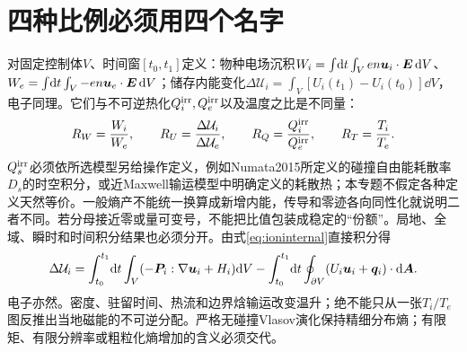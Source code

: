 \documentclass[UTF8,a4paper,11pt,openany,fontset=fandol]{ctexbook}
\begin{document}
\section{四种比例必须用四个名字}
对固定控制体$V$、时间窗$[t_0,t_1]$定义：物种电场沉积$W_i=\int\!\mathrm d t\int_Ven\bm{u}_i\cdot\bm{E}\,\mathrm d V$、$W_e=\int\!\mathrm d t\int_V-en\bm{u}_e\cdot\bm{E}\,\mathrm d V$；储存内能变化$\Delta\mathcal U_i=\int_V[U_i(t_1)-U_i(t_0)]\dd V$，电子同理。它们与不可逆热化$Q_i^{\rm irr},Q_e^{\rm irr}$以及温度之比是不同量：
\begin{equation}
R_W=\frac{W_i}{W_e},\qquad R_U=\frac{\Delta\mathcal U_i}{\Delta\mathcal U_e},\qquad
R_Q=\frac{Q_i^{\rm irr}}{Q_e^{\rm irr}},\qquad R_T=\frac{T_i}{T_e}.
\end{equation}
$Q_s^{\rm irr}$必须依所选模型另给操作定义，例如Numata2015所定义的碰撞自由能耗散率$D_s$的时空积分，或近Maxwell输运模型中明确定义的耗散热；本专题不假定各种定义天然等价。一般熵产不能统一换算成新增内能，传导和零迹各向同性化就说明二者不同。若分母接近零或量可变号，不能把比值包装成稳定的“份额”。局地、全域、瞬时和时间积分结果也必须分开。由式\eqref{eq:ioninternal}直接积分得
\begin{equation}
\Delta\mathcal U_i=\int_{t_0}^{t_1}\!\mathrm d t\int_V(-\bm{P}_i:\nabla\bm{u}_i+H_i)\mathrm d V
-\int_{t_0}^{t_1}\!\mathrm d t\oint_{\partial V}(U_i\bm{u}_i+\bm{q}_i)\cdot\mathrm d\bm{A}.
\end{equation}
电子亦然。密度、驻留时间、热流和边界焓输运改变温升；绝不能只从一张$T_i/T_e$图反推出当地磁能的不可逆分配。严格无碰撞Vlasov演化保持精细分布熵；有限矩、有限分辨率或粗粒化熵增加的含义必须交代。
\end{document}
